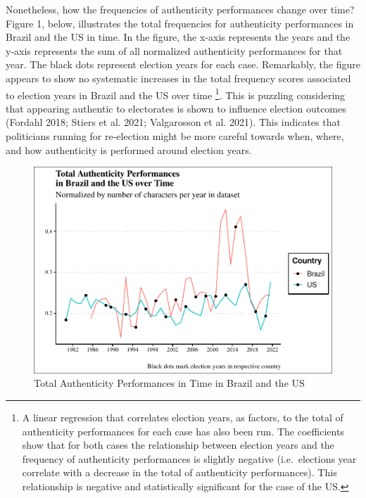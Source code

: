 \documentclass[smallextended]{svjour3}       %
\begin{document}
Nonetheless, how the frequencies of authenticity performances change
over time? Figure 1, below, illustrates the total frequencies for
authenticity performances in Brazil and the US in time. In the figure,
the x-axis represents the years and the y-axis represents the sum of all
normalized authenticity performances for that year. The black dots
represent election years for each case. Remarkably, the figure appears
to show no systematic increases in the total frequency scores associated
to election years in Brazil and the US over time \footnote{ A linear
  regression that correlates election years, as factors, to the total of
  authenticity performances for each case has also been run. The
  coefficients show that for both cases the relationship between
  election years and the frequency of authenticity performances is
  slightly negative (i.e.~elections year correlate with a decrease in
  the total of authenticity performances). This relationship is negative
  and statistically significant for the case of the US.}. This is
puzzling considering that appearing authentic to electorates is shown to
influence election outcomes (Fordahl 2018; Stiers et al. 2021;
Valgarosson et al. 2021). This indicates that politicians running for
re-election might be more careful towards when, where, and how
authenticity is performed around election years.

\begin{figure}
\centering
\includegraphics{antipc_files/figure-latex/Figure 1-1.pdf}
\caption{Total Authenticity Performances in Time in Brazil and the US}
\end{figure}
\end{document}

